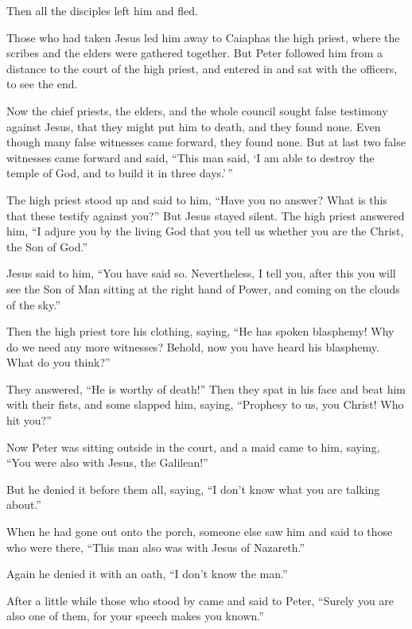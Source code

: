 Then all the disciples left him and fled.

 Those who had taken Jesus led him away to Caiaphas the
high priest, where the scribes and the elders were gathered together.
 But Peter followed him from a distance to the court of
the high priest, and entered in and sat with the officers, to see the
end.

 Now the chief priests, the elders, and the whole council
sought false testimony against Jesus, that they might put him to death,
 and they found none. Even though many false witnesses
came forward, they found none. But at last two false witnesses came
forward  and said, ``This man said, `I am able to destroy
the temple of God, and to build it in three days.'\,''

 The high priest stood up and said to him, ``Have you no
answer? What is this that these testify against you?'' 
But Jesus stayed silent. The high priest answered him, ``I adjure you by
the living God that you tell us whether you are the Christ, the Son of
God.''

 Jesus said to him, ``You have said so. Nevertheless, I
tell you, after this you will see the Son of Man sitting at the right
hand of Power, and coming on the clouds of the sky.''

 Then the high priest tore his clothing, saying, ``He has
spoken blasphemy! Why do we need any more witnesses? Behold, now you
have heard his blasphemy.  What do you think?''

They answered, ``He is worthy of death!''  Then they spat
in his face and beat him with their fists, and some slapped him,
 saying, ``Prophesy to us, you Christ! Who hit you?''

 Now Peter was sitting outside in the court, and a maid
came to him, saying, ``You were also with Jesus, the Galilean!''

 But he denied it before them all, saying, ``I don't know
what you are talking about.''

 When he had gone out onto the porch, someone else saw
him and said to those who were there, ``This man also was with Jesus of
Nazareth.''

 Again he denied it with an oath, ``I don't know the
man.''

 After a little while those who stood by came and said to
Peter, ``Surely you are also one of them, for your speech makes you
known.''

